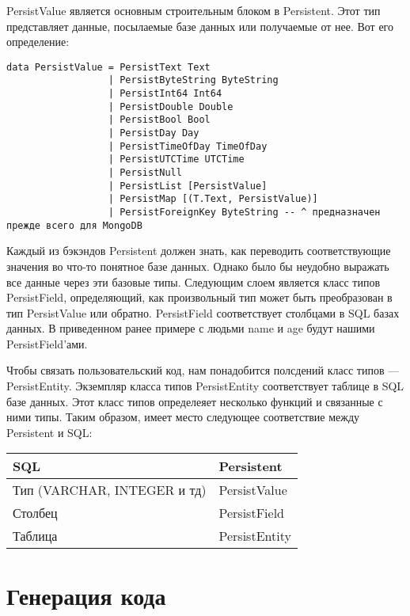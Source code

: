 PersistValue является основным строительным блоком в Persistent. Этот тип представляет данные, посылаемые базе данных или получаемые от нее. Вот его определение:

\begin{lstlisting}
data PersistValue = PersistText Text
                  | PersistByteString ByteString
                  | PersistInt64 Int64
                  | PersistDouble Double
                  | PersistBool Bool
                  | PersistDay Day
                  | PersistTimeOfDay TimeOfDay
                  | PersistUTCTime UTCTime
                  | PersistNull
                  | PersistList [PersistValue]
                  | PersistMap [(T.Text, PersistValue)]
                  | PersistForeignKey ByteString -- ^ предназначен прежде всего для MongoDB
\end{lstlisting}

Каждый из бэкэндов Persistent должен знать, как переводить соответствующие значения во что-то понятное базе данных. Однако было бы неудобно выражать все данные через эти базовые типы. Следующим слоем является класс типов PersistField, определяющий, как произвольный тип может быть преобразован в тип PersistValue или обратно. PersistField соответствует столбцами в SQL базах данных. В приведенном ранее примере с людьми name и age будут нашими PersistField'ами.

Чтобы связать пользовательский код, нам понадобится полсдений класс типов --- PersistEntity. Экземпляр класса типов PersistEntity соответствует таблице в SQL базе данных. Этот класс типов определеяет несколько функций и связанные с ними типы. Таким образом, имеет место следующее соответствие между Persistent и SQL:

\begin{center}
\begin{tabular}{ | l | l |}
\hline
SQL	& Persistent \\ \hline
Тип (VARCHAR, INTEGER и тд)	& PersistValue \\ \hline
Столбец & PersistField \\ \hline
Таблица	& PersistEntity \\ \hline
\end{tabular}
\end{center}

\section{Генерация кода} %

